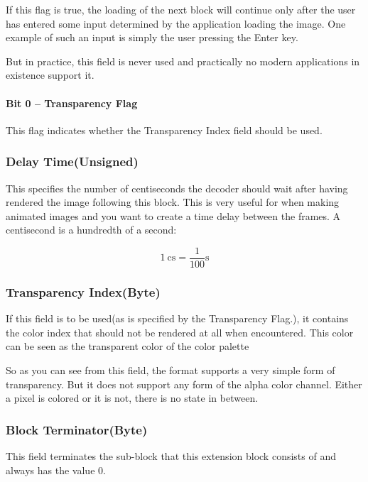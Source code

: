 If this flag is true, the loading of the next block will continue only
after the user has entered some input determined by the application
loading the image. One example of such an input is simply the user
pressing the Enter key.

But in practice, this field is never used and practically no modern
applications in existence support it.

\paragraph{Bit 0 -- Transparency Flag }

This flag indicates whether the Transparency Index field should be
used.

\subsubsection{Delay Time(Unsigned)}

This specifies the number of centiseconds the decoder should wait
after having rendered the image following this block. This is very
useful for when making animated \gif images and you want to create a time
delay between the frames. A centisecond is a hundredth of a second:

\begin{equation*}
  \SI{1}{\centi\second} = \frac{1}{100}\si{\second}
\end{equation*}

\subsubsection{Transparency Index(Byte)}

If this field is to be used(as is specified by the Transparency
Flag.), it contains the color index that should not be rendered at all
when encountered. This color can be seen as the transparent color of
the color palette

So as you can see from this field, the \gif format supports a very
simple form of transparency. But it does not support any form of the
alpha color channel. Either a pixel is colored or it is not, there is
no state in between.

\subsubsection{Block Terminator(Byte)}

This field terminates the sub-block that this extension block
consists of and always has the value $0$.

